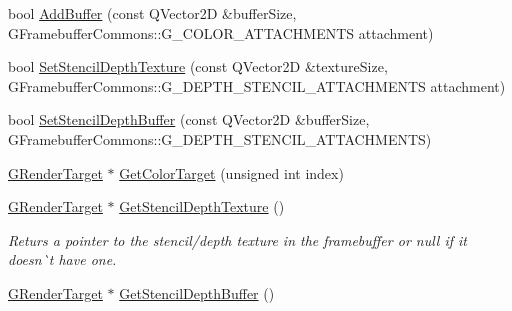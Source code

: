 \begin{DoxyCompactItemize}
\item 
bool \mbox{\hyperlink{class_geometry_engine_1_1_geometry_buffer_1_1_g_framebuffer_object_adfb75620d155c4af37683954df4eeb4d}{Add\+Buffer}} (const Q\+Vector2D \&buffer\+Size, G\+Framebuffer\+Commons\+::\+G\+\_\+\+C\+O\+L\+O\+R\+\_\+\+A\+T\+T\+A\+C\+H\+M\+E\+N\+TS attachment)
\item 
bool \mbox{\hyperlink{class_geometry_engine_1_1_geometry_buffer_1_1_g_framebuffer_object_a91836ba52af64e57cd6a7d0f3fce118f}{Set\+Stencil\+Depth\+Texture}} (const Q\+Vector2D \&texture\+Size, G\+Framebuffer\+Commons\+::\+G\+\_\+\+D\+E\+P\+T\+H\+\_\+\+S\+T\+E\+N\+C\+I\+L\+\_\+\+A\+T\+T\+A\+C\+H\+M\+E\+N\+TS attachment)
\item 
bool \mbox{\hyperlink{class_geometry_engine_1_1_geometry_buffer_1_1_g_framebuffer_object_a52a27b64109fd6e3bfd03428454d2f05}{Set\+Stencil\+Depth\+Buffer}} (const Q\+Vector2D \&buffer\+Size, G\+Framebuffer\+Commons\+::\+G\+\_\+\+D\+E\+P\+T\+H\+\_\+\+S\+T\+E\+N\+C\+I\+L\+\_\+\+A\+T\+T\+A\+C\+H\+M\+E\+N\+TS)
\item 
\mbox{\hyperlink{class_geometry_engine_1_1_geometry_buffer_1_1_g_render_target}{G\+Render\+Target}} $\ast$ \mbox{\hyperlink{class_geometry_engine_1_1_geometry_buffer_1_1_g_framebuffer_object_a340d3969c1dae0c35115ffcd2ff3772a}{Get\+Color\+Target}} (unsigned int index)
\item 
\mbox{\label{class_geometry_engine_1_1_geometry_buffer_1_1_g_framebuffer_object_a126e1a6708ebee33a9b975c2615cfcdd}} 
\mbox{\hyperlink{class_geometry_engine_1_1_geometry_buffer_1_1_g_render_target}{G\+Render\+Target}} $\ast$ \mbox{\hyperlink{class_geometry_engine_1_1_geometry_buffer_1_1_g_framebuffer_object_a126e1a6708ebee33a9b975c2615cfcdd}{Get\+Stencil\+Depth\+Texture}} ()
\begin{DoxyCompactList}\small\item\em Returs a pointer to the stencil/depth texture in the framebuffer or null if it doesn\`{}t have one. \end{DoxyCompactList}\item 
\mbox{\label{class_geometry_engine_1_1_geometry_buffer_1_1_g_framebuffer_object_a71b147f743503231295d5d4df916c5ba}} 
\mbox{\hyperlink{class_geometry_engine_1_1_geometry_buffer_1_1_g_render_target}{G\+Render\+Target}} $\ast$ \mbox{\hyperlink{class_geometry_engine_1_1_geometry_buffer_1_1_g_framebuffer_object_a71b147f743503231295d5d4df916c5ba}{Get\+Stencil\+Depth\+Buffer}} ()

\end{DoxyCompactItemize}

